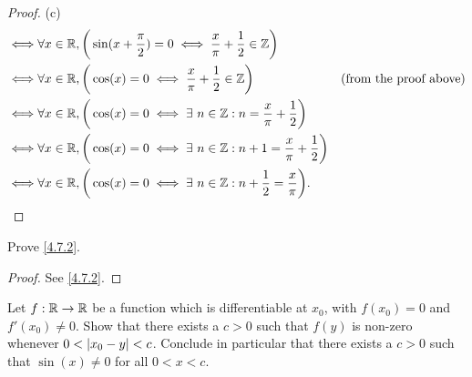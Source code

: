 \begin{proof}{(c)}
\begin{align*}
    \iff & \forall x \in \mathbb{R}, \bigg(\sin(x + \frac{\pi}{2}) = 0 \iff \frac{x}{\pi} + \frac{1}{2} \in \mathbb{Z}\bigg)                                      \\
    \iff & \forall x \in \mathbb{R}, \bigg(\cos(x) = 0 \iff \frac{x}{\pi} + \frac{1}{2} \in \mathbb{Z}\bigg)                      & \text{(from the proof above)} \\
    \iff & \forall x \in \mathbb{R}, \bigg(\cos(x) = 0 \iff \exists\ n \in \mathbb{Z} : n = \frac{x}{\pi} + \frac{1}{2}\bigg)                                     \\
    \iff & \forall x \in \mathbb{R}, \bigg(\cos(x) = 0 \iff \exists\ n \in \mathbb{Z} : n + 1 = \frac{x}{\pi} + \frac{1}{2}\bigg)                                 \\
    \iff & \forall x \in \mathbb{R}, \bigg(\cos(x) = 0 \iff \exists\ n \in \mathbb{Z} : n + \frac{1}{2} = \frac{x}{\pi}\bigg).
  \end{align*}
\end{proof}

\exercisesection

\begin{ex}\label{ex:4.7.1}
  Prove \cref{4.7.2}.
\end{ex}

\begin{proof}
  See \cref{4.7.2}.
\end{proof}

\begin{ex}\label{ex:4.7.2}
  Let \(f : \mathbb{R} \to \mathbb{R}\) be a function which is differentiable at \(x_0\), with \(f(x_0) = 0\) and \(f'(x_0) \neq 0\).
  Show that there exists a \(c > 0\) such that \(f(y)\) is non-zero whenever \(0 < \left\lvert x_0 - y\right\rvert < c\).
  Conclude in particular that there exists a \(c > 0\) such that \(\sin(x) \neq 0\) for all \(0 < x < c\).
\end{ex}

